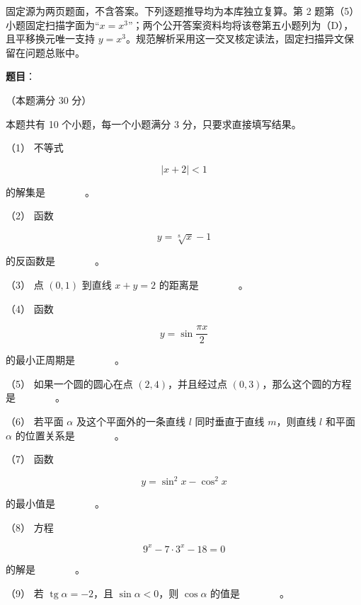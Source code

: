

\begin{gktip}
固定源为两页题面，不含答案。下列逐题推导均为本库独立复算。第 2 题第（5）小题固定扫描字面为“$x=x^3$”；两个公开答案资料均将该卷第五小题列为（D），且平移换元唯一支持 $y=x^3$。规范解析采用这一交叉核定读法，固定扫描异文保留在问题总账中。
\end{gktip}

\begin{answer}

\textbf{题目}：

（本题满分 30 分）

本题共有 10 个小题，每一个小题满分 3 分，只要求直接填写结果。

（1） 不等式

\nopagebreak[4]
\[
|x+2|<1
\]

的解集是　　　　。

（2） 函数

\nopagebreak[4]
\[
y=\sqrt[8]{x}-1
\]

的反函数是　　　　。

（3） 点 $(0,1)$ 到直线 $x+y=2$ 的距离是　　　　。

（4） 函数

\nopagebreak[4]
\[
y=\sin\frac{\pi x}{2}
\]

的最小正周期是　　　　。

（5） 如果一个圆的圆心在点 $(2,4)$，并且经过点 $(0,3)$，那么这个圆的方程是　　　　。

（6） 若平面 $\alpha$ 及这个平面外的一条直线 $l$ 同时垂直于直线 $m$，则直线 $l$ 和平面 $\alpha$ 的位置关系是　　　　。

（7） 函数

\nopagebreak[4]
\[
y=\sin^2x-\cos^2x
\]

的最小值是　　　　。

（8） 方程

\nopagebreak[4]
\[
9^x-7\cdot3^x-18=0
\]

的解是　　　　。

（9） 若 $\operatorname{tg}\alpha=-2$，且 $\sin\alpha<0$，则 $\cos\alpha$ 的值是　　　　。


\end{answer}
